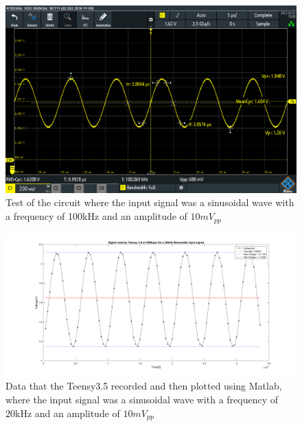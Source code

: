 \begin{figure}[h]
    \centering
    \includegraphics[width=1.0\textwidth]{graphics/100khz.PNG}
    \caption{Test of the circuit where the input signal was a sinusoidal wave with a frequency of 100kHz and an amplitude of $10mV_{pp}$}
    \label{fig:Cir100k}
\end{figure}



\begin{figure}[h]
    \centering
    \includegraphics[width=1.0\textwidth]{graphics/20khzMatlab.png}
    \caption{Data that the Teensy3.5 recorded and then plotted using Matlab, where the input signal was a sinusoidal wave with a frequency of 20kHz and an amplitude of $10mV_{pp}$}
    \label{fig:20kmatlab}
\end{figure}

